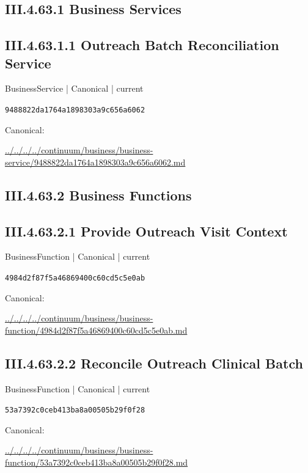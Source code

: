 \documentclass[10pt,a4paper]{article}
\begin{document}
\subsection*{III.4.63.1 Business Services}
\subsection*{III.4.63.1.1 Outreach Batch Reconciliation Service}
{\small BusinessService | Canonical | current}\par
\texttt{9488822da1764a1898303a9c656a6062}\par
Canonical: \par
{\footnotesize\url{../../../../continuum/business/business-service/9488822da1764a1898303a9c656a6062.md}}\par
\subsection*{III.4.63.2 Business Functions}
\subsection*{III.4.63.2.1 Provide Outreach Visit Context}
{\small BusinessFunction | Canonical | current}\par
\texttt{4984d2f87f5a46869400c60cd5c5e0ab}\par
Canonical: \par
{\footnotesize\url{../../../../continuum/business/business-function/4984d2f87f5a46869400c60cd5c5e0ab.md}}\par
\subsection*{III.4.63.2.2 Reconcile Outreach Clinical Batch}
{\small BusinessFunction | Canonical | current}\par
\texttt{53a7392c0ceb413ba8a00505b29f0f28}\par
Canonical: \par
{\footnotesize\url{../../../../continuum/business/business-function/53a7392c0ceb413ba8a00505b29f0f28.md}}\par
\end{document}
